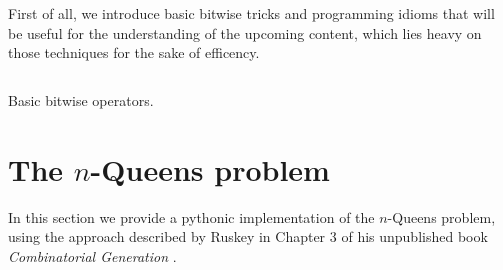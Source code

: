 

First of all, we introduce basic bitwise tricks and programming idioms that
will be useful for the understanding of the upcoming content, which lies heavy
on those techniques for the sake of efficency.
\begin{margintable}[2cm]
\inputminted[fontsize=\footnotesize]{python}{backtracking/bits_clean.py}
\caption{Basic bitwise operators.}
\end{margintable}


\section{The $n$-Queens problem}

In this section we provide a pythonic implementation of the $n$-Queens problem,
using the approach described by Ruskey 
in Chapter 3 of his unpublished book
\textit{Combinatorial Generation}
.

